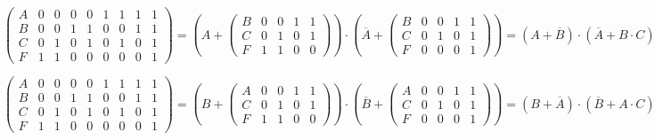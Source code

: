\documentclass[a4paper,10pt]{article} %
\begin{document}
	\begin{equation}
		\left(
		\begin{smallmatrix}
			A & 0 & 0 & 0 & 0 & 1 & 1 & 1 & 1 \\
			B & 0 & 0 & 1 & 1 & 0 & 0 & 1 & 1 \\
			C & 0 & 1 & 0 & 1 & 0 & 1 & 0 & 1 \\
			F & 1 & 1 & 0 & 0 & 0 & 0 & 0 & 1
		\end{smallmatrix}
		\right)
		= \left(A + 
		\left(
		\begin{smallmatrix}
			B & 0 & 0 & 1 & 1 \\
			C & 0 & 1 & 0 & 1 \\
			F & 1 & 1 & 0 & 0
		\end{smallmatrix}
		\right)
		\right) \cdot \left( \overline{A} + 
		\left(
		\begin{smallmatrix}
			B & 0 & 0 & 1 & 1 \\
			C & 0 & 1 & 0 & 1 \\
			F & 0 & 0 & 0 & 1
		\end{smallmatrix}
		\right)
		\right) = (A + \overline{B}) \cdot (\overline{A} + B \cdot C)
	\end{equation}
	
	\begin{equation}
		\left(
		\begin{smallmatrix}
			A & 0 & 0 & 0 & 0 & 1 & 1 & 1 & 1 \\
			B & 0 & 0 & 1 & 1 & 0 & 0 & 1 & 1 \\
			C & 0 & 1 & 0 & 1 & 0 & 1 & 0 & 1 \\
			F & 1 & 1 & 0 & 0 & 0 & 0 & 0 & 1
		\end{smallmatrix}
		\right)
		= \left(B + 
		\left(
		\begin{smallmatrix}
			A & 0 & 0 & 1 & 1 \\
			C & 0 & 1 & 0 & 1 \\
			F & 1 & 1 & 0 & 0
		\end{smallmatrix}
		\right)
		\right) \cdot \left(\overline{B} + 
		\left(
		\begin{smallmatrix}
			A & 0 & 0 & 1 & 1 \\
			C & 0 & 1 & 0 & 1 \\
			F & 0 & 0 & 0 & 1
		\end{smallmatrix}  
		\right)
		\right) = (B + \overline{A}) \cdot (\overline{B} + A \cdot C)
	\end{equation}
	
\end{document}
